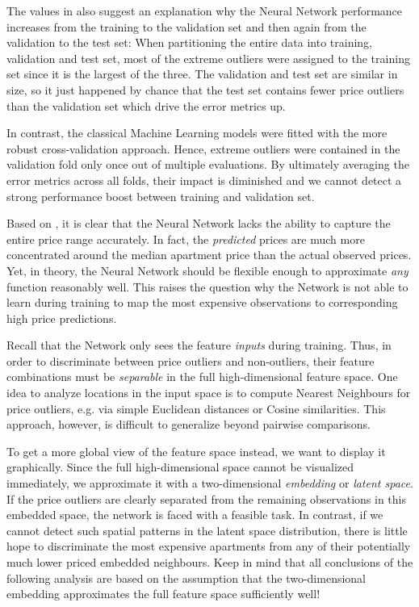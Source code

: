 The values in  also suggest an explanation why the Neural Network performance increases from the training to the validation set and then again from the validation to the test set:
When partitioning the entire data into training, validation and test set, most of the extreme outliers were assigned to the training set since it is the largest of the three.
The validation and test set are similar in size, so it just happened by chance that the test set contains fewer price outliers than the validation set which drive the error metrics up.

In contrast, the classical Machine Learning models were fitted with the more robust cross-validation approach.
Hence, extreme outliers were contained in the validation fold only once out of multiple evaluations.
By ultimately averaging the error metrics across all folds, their impact is diminished and we cannot detect a strong performance boost between training and validation set.

Based on , it is clear that the Neural Network lacks the ability to capture the entire price range accurately.
In fact, the \emph{predicted} prices are much more concentrated around the median apartment price than the actual observed prices.
Yet, in theory, the Neural Network should be flexible enough to approximate \emph{any} function reasonably well.
This raises the question why the Network is not able to learn during training to map the most expensive observations to corresponding high price predictions.

Recall that the Network only sees the feature \emph{inputs} during training.
Thus, in order to discriminate between price outliers and non-outliers, their feature combinations must be \emph{separable} in the full high-dimensional feature space.
One idea to analyze locations in the input space is to compute Nearest Neighbours for price outliers, e.g. via simple Euclidean distances or Cosine similarities.
This approach, however, is difficult to generalize beyond pairwise comparisons.

To get a more global view of the feature space instead, we want to display it graphically.
Since the full high-dimensional space cannot be visualized immediately, we approximate it with a two-dimensional \emph{embedding} or \emph{latent space}.
If the price outliers are clearly separated from the remaining observations in this embedded space, the network is faced with a feasible task.
In contrast, if we cannot detect such spatial patterns in the latent space distribution, there is little hope to discriminate the most expensive apartments from any of their potentially much lower priced embedded neighbours.
Keep in mind that all conclusions of the following analysis are based on the assumption that the two-dimensional embedding approximates the full feature space sufficiently well!

